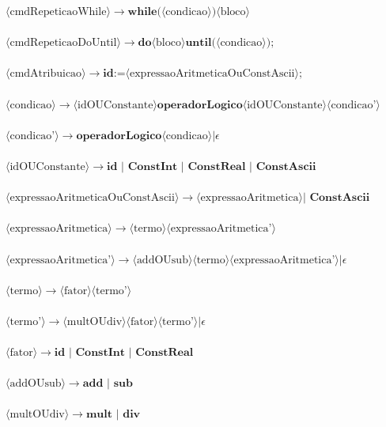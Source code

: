 \documentclass[11pt]{article}
\begin{document}
$\langle\text{cmdRepeticaoWhile}\rangle \rightarrow \textbf{while(} \langle\text{condicao}\rangle \textbf{)} \langle\text{bloco}\rangle $\\\\
$\langle\text{cmdRepeticaoDoUntil}\rangle \rightarrow \textbf{do} \langle\text{bloco}\rangle \textbf{until(} \langle\text{condicao}\rangle \textbf{)} \textbf{;}$\\\\
$\langle\text{cmdAtribuicao}\rangle \rightarrow  \textbf{id} \textbf{:=} \langle\text{expressaoAritmeticaOuConstAscii}\rangle \textbf{;} $\\\\
$\langle\text{condicao}\rangle \rightarrow  \langle\text{idOUConstante}\rangle \textbf{operadorLogico} \langle\text{idOUConstante}\rangle \langle\text{condicao'}\rangle $\\\\
$\langle\text{condicao'}\rangle \rightarrow  \textbf{operadorLogico} \langle\text{condicao}\rangle | \epsilon $\\\\
$\langle\text{idOUConstante}\rangle \rightarrow  \textbf{id }|  \textbf{ ConstInt } | \textbf{ ConstReal } | \textbf{ ConstAscii}$\\\\
$\langle\text{expressaoAritmeticaOuConstAscii}\rangle \rightarrow \langle\text{expressaoAritmetica}\rangle | \textbf{ ConstAscii}$\\\\
$\langle\text{expressaoAritmetica}\rangle \rightarrow  \langle\text{termo}\rangle \langle\text{expressaoAritmetica'}\rangle$\\\\
$\langle\text{expressaoAritmetica'}\rangle \rightarrow \langle\text{addOUsub}\rangle \langle\text{termo}\rangle \langle\text{expressaoAritmetica'}\rangle | \epsilon $\\\\
$\langle\text{termo}\rangle \rightarrow \langle\text{fator}\rangle \langle\text{termo'}\rangle $\\\\
$\langle\text{termo'}\rangle \rightarrow \langle\text{multOUdiv}\rangle \langle\text{fator}\rangle \langle\text{termo'}\rangle | \epsilon $\\\\
$\langle\text{fator}\rangle \rightarrow \textbf{id }| \textbf{ ConstInt } | \textbf{ ConstReal } $\\\\
$\langle\text{addOUsub}\rangle \rightarrow  \textbf{add } | \textbf{ sub}$ \\\\
$\langle\text{multOUdiv}\rangle \rightarrow  \textbf{mult } | \textbf{ div}$ \\\\
\end{document}
